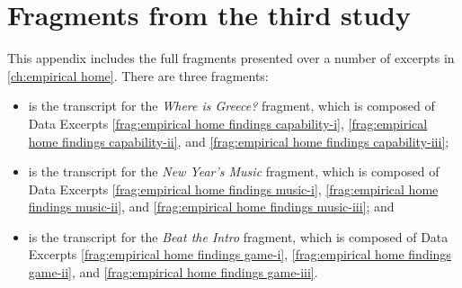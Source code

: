 


\chapter{Fragments from the third study}\label{app:fragments-hoem}



This appendix includes the full fragments presented over a number of excerpts in \autoref{ch:empirical home}. There are three fragments:

\begin{itemize}
    \item {} is the transcript for the \textit{Where is Greece?} fragment, which is composed of Data Excerpts \ref{frag:empirical home findings capability-i}, \ref{frag:empirical home findings capability-ii}, and \ref{frag:empirical home findings capability-iii};
    \item {} is the transcript for the \textit{New Year's Music} fragment, which is composed of Data Excerpts \ref{frag:empirical home findings music-i}, \ref{frag:empirical home findings music-ii}, and \ref{frag:empirical home findings music-iii}; and
    \item {} is the transcript for the \textit{Beat the Intro} fragment, which is composed of Data Excerpts \ref{frag:empirical home findings game-i}, \ref{frag:empirical home findings game-ii}, and \ref{frag:empirical home findings game-iii}.
\end{itemize}




